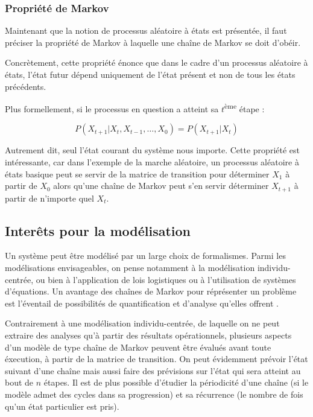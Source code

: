 \documentclass[12pt]{article}
\begin{document}
\subsubsection{Propriété de Markov}

Maintenant que la notion de processus aléatoire à états est présentée,
il faut préciser la propriété de Markov à laquelle une chaîne de
Markov se doit d'obéir.

Concrètement, cette propriété énonce que dans le cadre d'un processus
aléatoire à états, l'état futur dépend uniquement de l'état présent et
non de tous les états précédents.

Plus formellement, si le processus en question a atteint sa
$t$\textsuperscript{ème} étape :

$$
P(X_{t+1} | X_{t}, X_{t-1}, \dots, X_0) = P(X_{t+1} | X_t)
$$

Autrement dit, seul l'état courant du système nous importe. Cette
propriété est intéressante, car dans l'exemple de la marche aléatoire,
un processus aléatoire à états basique peut se servir de la matrice de
transition pour déterminer $X_1$ à partir de $X_0$ alors qu'une chaîne
de Markov peut s'en servir déterminer $X_{t+1}$ à partir de n'importe
quel $X_t$.

\subsection{Interêts pour la modélisation}

Un système peut être modélisé par un large choix de formalismes. Parmi
les modélisations envisageables, on pense notamment à la modélisation
individu-centrée, ou bien à l'application de lois logistiques ou à
l'utilisation de systèmes d'équations. Un avantage des chaînes de
Markov pour réprésenter un problème est l'éventail de possibilités de
quantification et d'analyse qu'elles offrent \cite{izq}.

Contrairement à une modélisation individu-centrée, de laquelle on ne
peut extraire des analyses qu'à partir des résultats opérationnels,
plusieurs aspects d'un modèle de type chaîne de Markov peuvent être
évalués avant toute éxecution, à partir de la matrice de
transition. On peut évidemment prévoir l'état suivant d'une chaîne
mais aussi faire des prévisions sur l'état qui sera atteint au bout de
$n$ étapes. Il est de plus possible d'étudier la périodicité d'une
chaîne (si le modèle admet des cycles dans sa progression) et sa
récurrence (le nombre de fois qu'un état particulier est pris).
\end{document}
